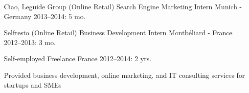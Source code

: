 \begin{cventries}
  \cventryshort
    {Ciao, Leguide Group (Online Retail)} %
    {Search Engine Marketing Intern} %
    {Munich - Germany} %
    {2013--2014: 5 mo.} %

  \cventryshort
    {Selfresto (Online Retail)} %
    {Business Development Intern} %
    {Montbéliard - France} %
    {2012--2013: 3 mo.} %

  \cventry
    {Self-employed} %
    {Freelance} %
    {France} %
    {2012--2014: 2 yrs.} %
    {
      \begin{cvitems} %
        \item {Provided business development, online marketing, and IT consulting services for startups and SMEs}
      \end{cvitems}
    }

\end{cventries}
